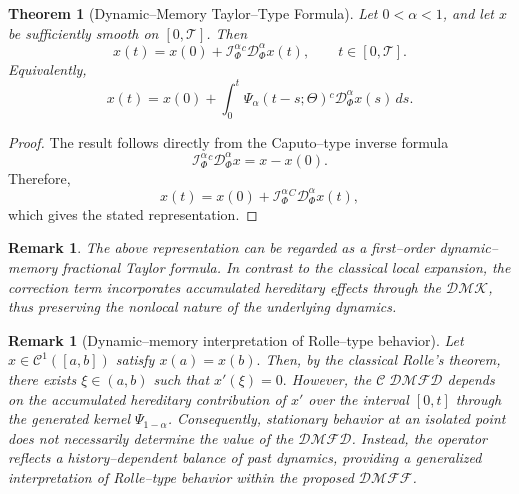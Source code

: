 \documentclass[11pt]{article}
\numberwithin{equation}{section}
\newtheorem{theorem}[definition]{Theorem}
\newtheorem{remark}[definition]{Remark}
\begin{document}
\begin{theorem}[Dynamic--Memory Taylor--Type Formula]
Let \(0<\alpha<1\), and let \(x\) be sufficiently smooth on \([0,\mathcal{T}]\). Then
\[
x(t)
=
x(0)
+
\mathcal I_{\Phi}^{\alpha}
{}^{c}\mathcal D_{\Phi}^{\alpha}x(t),
\qquad t\in[0,\mathcal{T}].
\]
Equivalently,
\[
x(t)
=
x(0)
+
\int_{0}^{t}
\Psi_{\alpha}(t-s;\Theta)
{}^{c}\mathcal D_{\Phi}^{\alpha}x(s)\,ds.
\]
\end{theorem}

\begin{proof}
The result follows directly from the Caputo--type inverse formula
\[
\mathcal I_{\Phi}^{\alpha}
{}^{c}\mathcal D_{\Phi}^{\alpha}x
=
x-x(0).
\]
Therefore,
\[
x(t)
=
x(0)
+
\mathcal I_{\Phi}^{\alpha}
{}^{C}\mathcal D_{\Phi}^{\alpha}x(t),
\]
which gives the stated representation.
\end{proof}

\begin{remark}
The above representation can be regarded as a first--order dynamic--memory fractional Taylor formula. In contrast to the classical local expansion, the correction term incorporates accumulated hereditary effects through the  $\mathcal{DMK}$, thus preserving the nonlocal nature of the underlying dynamics.
\end{remark}

\begin{remark}[Dynamic--memory interpretation of Rolle--type behavior]
Let
\(
x\in \mathcal{C}^{1}([a,b])
\)
satisfy
\(
x(a)=x(b).
\)
Then, by the classical Rolle's theorem, there exists
\(
\xi\in(a,b)
\)
such that
\(
x'(\xi)=0.
\)
However, the $\mathcal{C\;DMFD}$
depends on the accumulated hereditary contribution of $x'$ over the interval $[0,t]$ through the generated kernel $\Psi_{1-\alpha}$. Consequently, stationary behavior at an isolated point does not necessarily determine the value of the $\mathcal{DMFD}$. Instead, the operator reflects a history--dependent balance of past dynamics, providing a generalized interpretation of Rolle--type behavior within the proposed $\mathcal{DMFF}$.
\end{remark}
\end{document}

